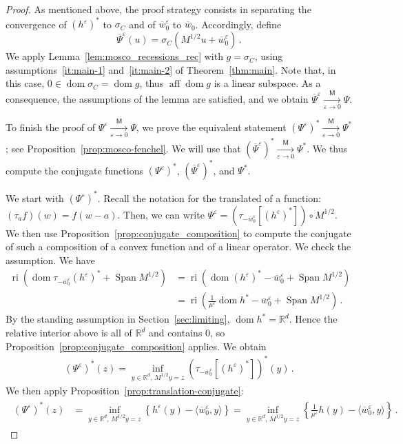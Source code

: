 \documentclass[11pt,english,reqno]{article}
\DeclareMathOperator{\Span}{Span}
\DeclareMathOperator{\dom}{dom}
\DeclareMathOperator{\ri}{ri}
\DeclareMathOperator{\aff}{aff}
\newcommand{\R}{\mathbb{R}}
\theoremstyle{plain}
\theoremstyle{definition}
\theoremstyle{remark}
\numberwithin{equation}{section}
\begin{document}
\begin{proof}
As mentioned above, the proof strategy consists in separating the convergence of $(h^\varepsilon)^*$ to $\sigma_C$ and of $\overline{w}^\varepsilon_0$ to $\overline{w}_0$. Accordingly, define
\begin{equation*}
	\overline{\Psi}^\varepsilon(u) = \sigma_C(M^{1/2} u + \overline{w}_0^\varepsilon) \, . 
\end{equation*}
We apply Lemma~\ref{lem:mosco_recessions_rec} with $g = \sigma_C$, using assumptions~\ref{it:main-1} and~\ref{it:main-2} of Theorem~\ref{thm:main}. Note that, in this case, $0 \in \dom \sigma_C = \dom g$, thus $\aff \dom g$ is a linear subspace. As a consequence, the assumptions of the lemma are satisfied, and we obtain $\overline{\Psi}^\varepsilon \xrightarrow[\varepsilon\to 0]{\mathsf{M}} {\Psi}$.

To finish the proof of $\Psi^\varepsilon \xrightarrow[\varepsilon\to 0]{\mathsf{M}} \Psi$, we prove the equivalent statement $(\Psi^\varepsilon)^* \xrightarrow[\varepsilon\to 0]{\mathsf{M}} \Psi^*$; see Proposition~\ref{prop:mosco-fenchel}. We will use that $(\overline{\Psi}^\varepsilon)^* \xrightarrow[\varepsilon\to 0]{\mathsf{M}} \Psi^*$. We thus compute the conjugate functions $(\Psi^\varepsilon)^*$, $(\overline{\Psi}^\varepsilon)^*$, and $\Psi^*$.

We start with $(\Psi^\varepsilon)^*$. Recall the notation for the translated of a function: $(\tau_a f)(w) = f(w - a)$. Then, we can write $\Psi^\varepsilon = \left(\tau_{-\overline{w}_0^\varepsilon} \left[(h^\varepsilon)^*\right]\right) \circ M^{1/2}$. We then use Proposition~\ref{prop:conjugate_composition} to compute the conjugate of such a composition of a convex function and of a linear operator. We check the assumption. We have 
\begin{align*}
	\ri\left(\dom \tau_{-\overline{w}_0^\varepsilon}(h^\varepsilon)^*+\Span M^{1/2}\right) &= \ri\left(\dom (h^\varepsilon)^* - \overline{w}_0^\varepsilon + \Span M^{1/2}\right) \\
	&= \ri\left(\frac{1}{\mu^\varepsilon} \dom h^* - \overline{w}_0^\varepsilon + \Span M^{1/2}\right) \, .
\end{align*}
By the standing assumption in Section~\ref{sec:limiting}, $\dom h^* = \R^d$. Hence the relative interior above is all of $\R^d$ and contains $0$, so Proposition~\ref{prop:conjugate_composition} applies. We obtain
\begin{align*}
	(\Psi^\varepsilon)^*(z) = \inf_{y \in \R^d, \,  M^{1/2}y=z} \left(\tau_{-\overline{w}_0^\varepsilon} \left[(h^\varepsilon)^*\right]\right)^*(y) \, . 
\end{align*}
We then apply Proposition~\ref{prop:translation-conjugate}: 
\begin{align}
	\label{eq:conjugate-psi-eps}
	\begin{split}
	(\Psi^\varepsilon)^*(z) &= \inf_{y \in \R^d, \,  M^{1/2}y=z} \left\{h^\varepsilon(y)-\langle \overline{w}_0^\varepsilon, y \rangle\right\} = \inf_{y \in \R^d, \,  M^{1/2}y=z} \left\{\frac{1}{\mu^\varepsilon}h(y)-\langle \overline{w}_0^\varepsilon, y \rangle\right\} \, .
	\end{split}
\end{align}



\end{proof}
\end{document}
